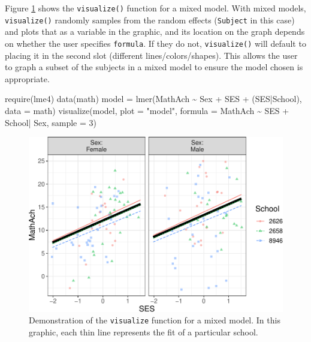 \documentclass[
  english,
  man]{apa6}
\newenvironment{Shaded}{\begin{snugshade}}{\end{snugshade}}
\newcommand{\AttributeTok}[1]{\textcolor[rgb]{0.77,0.63,0.00}{#1}}
\newcommand{\DecValTok}[1]{\textcolor[rgb]{0.00,0.00,0.81}{#1}}
\newcommand{\FunctionTok}[1]{\textcolor[rgb]{0.00,0.00,0.00}{#1}}
\newcommand{\NormalTok}[1]{#1}
\newcommand{\OtherTok}[1]{\textcolor[rgb]{0.56,0.35,0.01}{#1}}
\newcommand{\SpecialCharTok}[1]{\textcolor[rgb]{0.00,0.00,0.00}{#1}}
\newcommand{\StringTok}[1]{\textcolor[rgb]{0.31,0.60,0.02}{#1}}
\begin{document}
\normalsize

Figure \ref{fig:mixed} shows the \texttt{visualize()} function for a mixed model. With mixed models, \texttt{visualize()} randomly samples from the random effects (\texttt{Subject} in this case) and plots that as a variable in the graphic, and its location on the graph depends on whether the user specifies \texttt{formula}. If they do not, \texttt{visualize()} will default to placing it in the second slot (different lines/colors/shapes). This allows the user to graph a subset of the subjects in a mixed model to ensure the model chosen is appropriate.

\small

\begin{Shaded}
\begin{Highlighting}[]
\FunctionTok{require}\NormalTok{(lme4)}
\FunctionTok{data}\NormalTok{(math)}
\NormalTok{model }\OtherTok{=} \FunctionTok{lmer}\NormalTok{(MathAch }\SpecialCharTok{\textasciitilde{}}\NormalTok{ Sex }\SpecialCharTok{+}\NormalTok{ SES }\SpecialCharTok{+}\NormalTok{ (SES}\SpecialCharTok{|}\NormalTok{School), }\AttributeTok{data =}\NormalTok{ math)}
\FunctionTok{visualize}\NormalTok{(model, }
  \AttributeTok{plot =} \StringTok{"model"}\NormalTok{,}
  \AttributeTok{formula =}\NormalTok{ MathAch }\SpecialCharTok{\textasciitilde{}}\NormalTok{  SES }\SpecialCharTok{+}\NormalTok{ School}\SpecialCharTok{|}\NormalTok{ Sex, }
  \AttributeTok{sample =} \DecValTok{3}\NormalTok{)}
\end{Highlighting}
\end{Shaded}

\begin{figure}
\centering
\includegraphics{flexplot_psychmeth_files/figure-latex/mixed-1.pdf}
\caption{\label{fig:mixed}Demonstration of the \texttt{visualize} function for a mixed model. In this graphic, each thin line represents the fit of a particular school. \label{fig:mixed}}
\end{figure}
\end{document}
